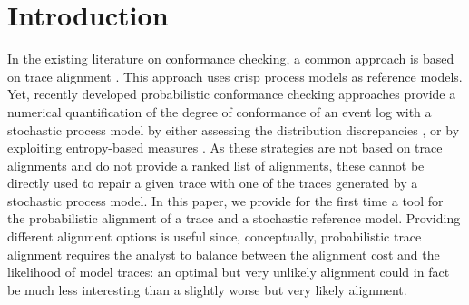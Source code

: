 
\section{Introduction}
\label{introduction}
%
In the existing literature on conformance checking, a common approach is based on trace alignment \cite{DBLP:conf/edoc/AdriansyahDA11}. This approach uses crisp process models as reference models. Yet, recently developed probabilistic conformance checking approaches provide a numerical quantification of the degree of conformance
of an event log with a stochastic process model by either assessing the distribution discrepancies \cite{DBLP:conf/bpm/LeemansSA19}, or by exploiting entropy-based measures \cite{DBLP:conf/icpm/PolyvyanyyK19,DBLP:journals/tosem/PolyvyanyySWCM20}.
As these strategies are not based on trace alignments and do not provide a ranked list of alignments, these cannot be directly used to repair a given trace with one of the traces generated by a stochastic process model.
%
In this paper, we provide for the first time a tool   for the probabilistic alignment of a trace and a stochastic reference
model. %
Providing different alignment options is useful since, conceptually, probabilistic trace alignment requires the analyst to 
balance between the alignment cost and the likelihood of model traces: an optimal but very unlikely alignment could in fact be much less interesting than a slightly worse but very likely alignment.

